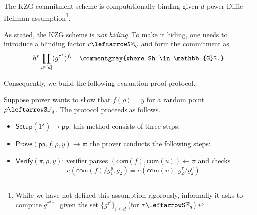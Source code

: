 \documentclass[../../book]{subfiles}
\begin{document}
\begin{lemma}
    The KZG commitment scheme is computationally binding given $d$-power Diffie-Hellman assumption\footnote{While we have not defined this assumption rigorously, informally it asks to compute $g^{\tau^{d+1}}$ given the set $\{g^{\tau^i}\}_{i\leq d}$ (for $\tau \leftarrowS \mathbb{F}_q$).}.
\end{lemma}

\begin{remark}
    As stated, the KZG scheme is \emph{not hiding}. To make it hiding, one needs to introduce a blinding factor $r \leftarrowS \mathbb{Z}_q$ and form the commitment as
    \begin{equation*}
        h^r\prod_{i \in [d]}(g^{\tau^i})^{f_i} \quad \commentgray{where $h \in \mathbb{G}$.}
    \end{equation*}
\end{remark}

Consequently, we build the following evaluation proof protocol.

\begin{definition}\label{def:kzg-proof}
    Suppose prover wants to show that $f(\rho)=y$ for a random point $\rho \leftarrowS \mathbb{F}_q$.
    The protocol proceeds as follows.
    \begin{itemize}
        \item $\mathsf{Setup}(1^{\lambda}) \to \mathsf{pp}$: this method consists of three steps:
        \item $\mathsf{Prove}(\mathsf{pp},f,\rho,y) \to \pi$: the prover conducts the following steps: 
        \item $\mathsf{Verify}(\pi, \rho, y)$: verifier parses $(\mathsf{com}(f), \mathsf{com}(u)) \gets \pi$ and checks
        \begin{equation*}
            e(\mathsf{com}(f)/g_1^y, g_2) = e(\mathsf{com}(u), g_2^{\tau}/g_2^{\rho}).
        \end{equation*}
    \end{itemize}
\end{definition}
\end{document}
